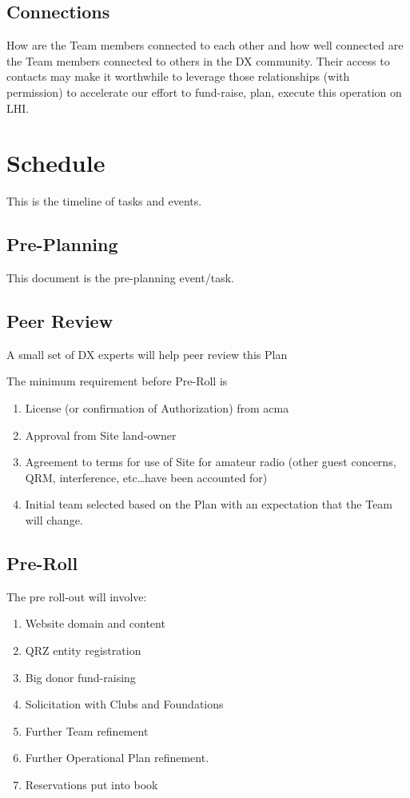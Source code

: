 \documentclass[11pt]{article}
\begin{document}
\subsection{Connections}
How are the Team members connected to each other and
how well connected are the Team members connected to
others in the DX community.  Their access to contacts
may make it worthwhile to leverage those relationships
(with permission) to accelerate our effort to 
fund-raise, plan, execute this operation on LHI.

\section{Schedule}

This is the timeline of tasks and events.

\subsection{Pre-Planning}

This document is the pre-planning event/task.

\subsection{Peer Review}

A small set of DX experts will help peer review this Plan

The minimum requirement before Pre-Roll is
\begin{enumerate}
\item License (or confirmation of Authorization) from {\gls{acma}}
\item Approval from Site land-owner
\item Agreement to terms for use of Site for amateur radio (other
guest concerns, QRM, interference, etc\ldots have been accounted for)
\item Initial team selected based on the Plan with an expectation that
the Team will change.
\end{enumerate}

\subsection{Pre-Roll}

The pre roll-out will involve:
\begin{enumerate}
\item Website domain and content
\item QRZ entity registration
\item Big donor fund-raising
\item Solicitation with Clubs and Foundations
\item Further Team refinement
\item Further Operational Plan refinement.
\item Reservations put into book
\end{enumerate}
\end{document}
